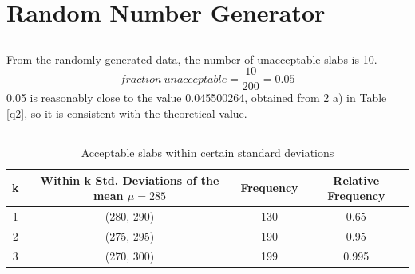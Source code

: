 \documentclass[letterpaper]{article}
\begin{document}
\section{Random Number Generator} %

\subsection{} %
From the randomly generated data, the number of unacceptable slabs is 10.
$$ {fraction\ unacceptable = \frac{10}{200} = 0.05} $$ 0.05 is reasonably close
to the value 0.045500264, obtained from 2 a) in Table \ref{q2}, so it is
consistent with the theoretical value.

\subsection{}


%

\begin{table}[H]
 \centering
 \begin{tabular}{|c|c|c|c|}
  \hline
  \textbf{k} & \textbf{Within k Std. Deviations of the mean $\mu=285$} & \textbf{Frequency} & \textbf{Relative Frequency} \\ \hline
  1          & (280, 290)                                              & 130                & 0.65                        \\\hline
  2          & (275, 295)                                              & 190                & 0.95                        \\ \hline
  3          & (270, 300)                                              & 199                & 0.995                       \\ \hline
 \end{tabular}
 \caption{Acceptable slabs within certain standard deviations}
 \label{q3}
\end{table}
\end{document}
